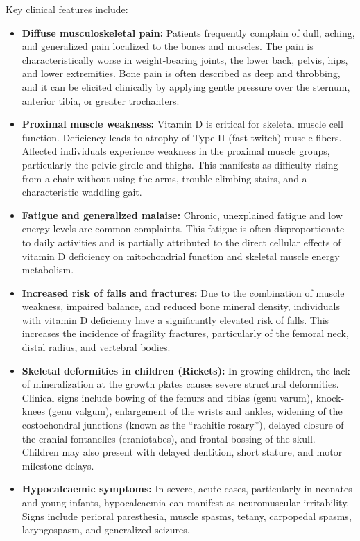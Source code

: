 Key clinical features include:
\begin{itemize}
    \item \textbf{Diffuse musculoskeletal pain:} Patients frequently complain of dull, aching, and generalized pain localized to the bones and muscles. The pain is characteristically worse in weight-bearing joints, the lower back, pelvis, hips, and lower extremities. Bone pain is often described as deep and throbbing, and it can be elicited clinically by applying gentle pressure over the sternum, anterior tibia, or greater trochanters.
    \item \textbf{Proximal muscle weakness:} Vitamin D is critical for skeletal muscle cell function. Deficiency leads to atrophy of Type II (fast-twitch) muscle fibers. Affected individuals experience weakness in the proximal muscle groups, particularly the pelvic girdle and thighs. This manifests as difficulty rising from a chair without using the arms, trouble climbing stairs, and a characteristic waddling gait.
    \item \textbf{Fatigue and generalized malaise:} Chronic, unexplained fatigue and low energy levels are common complaints. This fatigue is often disproportionate to daily activities and is partially attributed to the direct cellular effects of vitamin D deficiency on mitochondrial function and skeletal muscle energy metabolism.
    \item \textbf{Increased risk of falls and fractures:} Due to the combination of muscle weakness, impaired balance, and reduced bone mineral density, individuals with vitamin D deficiency have a significantly elevated risk of falls. This increases the incidence of fragility fractures, particularly of the femoral neck, distal radius, and vertebral bodies.
    \item \textbf{Skeletal deformities in children (Rickets):} In growing children, the lack of mineralization at the growth plates causes severe structural deformities. Clinical signs include bowing of the femurs and tibias (genu varum), knock-knees (genu valgum), enlargement of the wrists and ankles, widening of the costochondral junctions (known as the ``rachitic rosary''), delayed closure of the cranial fontanelles (craniotabes), and frontal bossing of the skull. Children may also present with delayed dentition, short stature, and motor milestone delays.
    \item \textbf{Hypocalcaemic symptoms:} In severe, acute cases, particularly in neonates and young infants, hypocalcaemia can manifest as neuromuscular irritability. Signs include perioral paresthesia, muscle spasms, tetany, carpopedal spasms, laryngospasm, and generalized seizures.
\end{itemize}


